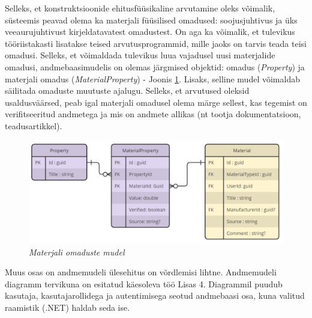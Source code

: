 Selleks, et konstruktsioonide ehitusfüüsikaline arvutamine oleks võimalik, süsteemis peavad olema ka 
materjali füüsilised omadused: soojusjuhtivus ja üks veeaurujuhtivust kirjeldatavatest omadustest. On 
aga ka võimalik, et tulevikus tööriistakasti lisatakse teised arvutusprogrammid, mille jaoks on tarvis teada
teisi omadusi. Selleks, et võimaldada tulevikus luua vajadusel uusi materjalide omadusi, andmebaasimudelis
on olemas järgmised objektid: omadus (\textit{Property}) ja materjali omadus (\textit{MaterialProperty}) - Joonis 
\ref{fig:db_properties_model}. Lisaks, selline mudel võimaldab säilitada omaduste muutuste ajalugu.
Selleks, et arvutused oleksid usaldusväärsed, peab igal materjali omadusel olema märge sellest, kas 
tegemist on verifitseeritud andmetega ja mis on andmete allikas (nt tootja dokumentatsioon, teadusartikkel).

\begin{figure}[ht]
    \centering
    \includegraphics[width=.8\textwidth]{figures/analysis/db_desing_2.png}
    \caption[Materjali omaduste mudel]{\textit{Materjali omaduste mudel}}
    \label{fig:db_properties_model}
\end{figure}

Muus osas on andmemudeli ülesehitus on võrdlemisi lihtne. Andmemudeli diagramm tervikuna on esitatud käesoleva töö Lisas 4.
Diagrammil puudub kasutaja, kasutajarollidega ja autentimisega seotud andmebaasi osa, kuna valitud raamistik (.NET) haldab
seda ise.